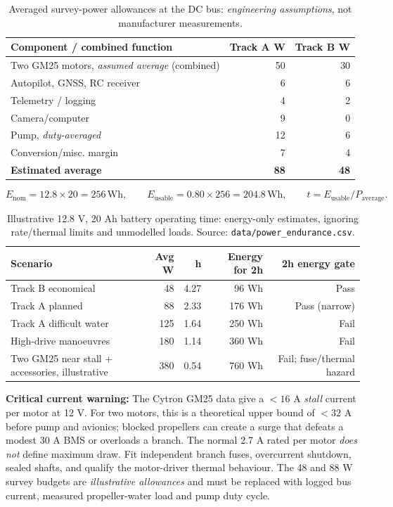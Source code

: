 \documentclass[10pt,a4paper]{article}
\begin{document}
\begin{table}[H]\centering\footnotesize
\caption{Averaged survey-power allowances at the DC bus: \emph{engineering assumptions}, not manufacturer measurements.}
\begin{tabularx}{\linewidth}{@{}Yrr@{}}\toprule
Component / combined function & Track A W & Track B W\\\midrule
Two GM25 motors, \emph{assumed average} (combined) & 50 & 30\\
Autopilot, GNSS, RC receiver & 6 & 6\\
Telemetry / logging & 4 & 2\\
Camera/computer & 9 & 0\\
Pump, \emph{duty-averaged} & 12 & 6\\
Conversion/misc. margin & 7 & 4\\\midrule
\textbf{Estimated average} & \textbf{88} & \textbf{48}\\\bottomrule\end{tabularx}\end{table}
\[E_{\mathrm{nom}}=12.8\times20=256\,\mathrm{Wh},\qquad E_{\mathrm{usable}}=0.80\times256=204.8\,\mathrm{Wh},\qquad t=E_{\mathrm{usable}}/P_{\mathrm{average}}.\]
\begin{table}[H]\centering\footnotesize
\caption{Illustrative 12.8 V, 20 Ah battery operating time: energy-only estimates, ignoring rate/thermal limits and unmodelled loads. Source: \texttt{data/power\_endurance.csv}.}
\begin{tabularx}{\linewidth}{@{}Yrrrr@{}}\toprule
Scenario & Avg W & h & Energy for 2h & 2h energy gate\\\midrule
Track B economical & 48 & 4.27 & 96 Wh & Pass\\
Track A planned & 88 & 2.33 & 176 Wh & Pass (narrow)\\
Track A difficult water & 125 & 1.64 & 250 Wh & Fail\\
High-drive manoeuvres & 180 & 1.14 & 360 Wh & Fail\\
Two GM25 near stall + accessories, illustrative & 380 & 0.54 & 760 Wh & Fail; fuse/thermal hazard\\\bottomrule\end{tabularx}\end{table}
\textbf{Critical current warning:} The Cytron GM25 data give a $<16$ A \emph{stall} current per motor at 12 V. For two motors, this is a theoretical upper bound of $<32$ A before pump and avionics; blocked propellers can create a surge that defeats a modest 30 A BMS or overloads a branch. The normal 2.7 A rated per motor \emph{does not} define maximum draw. Fit independent branch fuses, overcurrent shutdown, sealed shafts, and qualify the motor-driver thermal behaviour. The 48 and 88 W survey budgets are \emph{illustrative allowances} and must be replaced with logged bus current, measured propeller-water load and pump duty cycle. 
\end{document}
